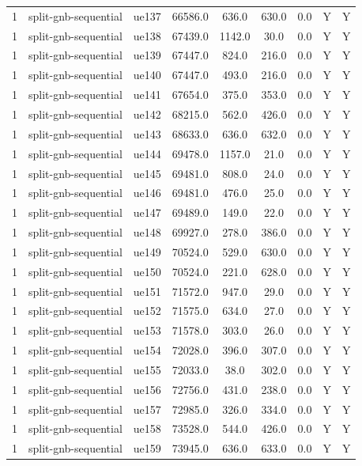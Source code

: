 \begin{table}[ht]
\begin{tabular}{|c|c|c|c|c|c|c|c|c|}
1 & split-gnb-sequential & ue137 & 66586.0 & 636.0 & 630.0 & 0.0 & Y & Y \\
1 & split-gnb-sequential & ue138 & 67439.0 & 1142.0 & 30.0 & 0.0 & Y & Y \\
1 & split-gnb-sequential & ue139 & 67447.0 & 824.0 & 216.0 & 0.0 & Y & Y \\
1 & split-gnb-sequential & ue140 & 67447.0 & 493.0 & 216.0 & 0.0 & Y & Y \\
1 & split-gnb-sequential & ue141 & 67654.0 & 375.0 & 353.0 & 0.0 & Y & Y \\
1 & split-gnb-sequential & ue142 & 68215.0 & 562.0 & 426.0 & 0.0 & Y & Y \\
1 & split-gnb-sequential & ue143 & 68633.0 & 636.0 & 632.0 & 0.0 & Y & Y \\
1 & split-gnb-sequential & ue144 & 69478.0 & 1157.0 & 21.0 & 0.0 & Y & Y \\
1 & split-gnb-sequential & ue145 & 69481.0 & 808.0 & 24.0 & 0.0 & Y & Y \\
1 & split-gnb-sequential & ue146 & 69481.0 & 476.0 & 25.0 & 0.0 & Y & Y \\
1 & split-gnb-sequential & ue147 & 69489.0 & 149.0 & 22.0 & 0.0 & Y & Y \\
1 & split-gnb-sequential & ue148 & 69927.0 & 278.0 & 386.0 & 0.0 & Y & Y \\
1 & split-gnb-sequential & ue149 & 70524.0 & 529.0 & 630.0 & 0.0 & Y & Y \\
1 & split-gnb-sequential & ue150 & 70524.0 & 221.0 & 628.0 & 0.0 & Y & Y \\
1 & split-gnb-sequential & ue151 & 71572.0 & 947.0 & 29.0 & 0.0 & Y & Y \\
1 & split-gnb-sequential & ue152 & 71575.0 & 634.0 & 27.0 & 0.0 & Y & Y \\
1 & split-gnb-sequential & ue153 & 71578.0 & 303.0 & 26.0 & 0.0 & Y & Y \\
1 & split-gnb-sequential & ue154 & 72028.0 & 396.0 & 307.0 & 0.0 & Y & Y \\
1 & split-gnb-sequential & ue155 & 72033.0 & 38.0 & 302.0 & 0.0 & Y & Y \\
1 & split-gnb-sequential & ue156 & 72756.0 & 431.0 & 238.0 & 0.0 & Y & Y \\
1 & split-gnb-sequential & ue157 & 72985.0 & 326.0 & 334.0 & 0.0 & Y & Y \\
1 & split-gnb-sequential & ue158 & 73528.0 & 544.0 & 426.0 & 0.0 & Y & Y \\
1 & split-gnb-sequential & ue159 & 73945.0 & 636.0 & 633.0 & 0.0 & Y & Y \\

\end{tabular}
\end{table}
